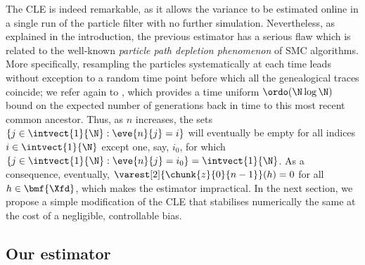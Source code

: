 The CLE is indeed remarkable, as it allows the variance to be estimated online in a single run of the particle filter with no further simulation. Nevertheless, as explained in the introduction, the previous estimator has a serious flaw which is related to the well-known \emph{particle path depletion phenomenon} of SMC algorithms. More specifically, resampling the particles systematically at each time  leads without exception to a random time point before which all the genealogical traces coincide; we refer again to \cite{jacob:murray:rubenthaler:2015}, which provides a time uniform $\ordo(\N \log \N)$ bound on the expected number of generations back in time to this most recent common ancestor. Thus, as $n$ increases, the sets $\{ j \in \intvect{1}{\N} : \eve{n}{j} = i \}$ will eventually be empty for all indices $i \in \intvect{1}{\N}$ except one, say, $i_0$, for which $\{ j \in \intvect{1}{\N} : \eve{n}{j} = i_0 \} = \intvect{1}{\N}$. As a consequence, eventually, $\varest[2]{\chunk{z}{0}{n - 1}}(h) = 0$ for all $h \in \bmf{\Xfd}$, which makes the estimator impractical. In the next section, we propose a simple modification of the CLE that stabilises numerically the same at the cost of a negligible, controllable bias. 

\subsection{Our estimator}
\label{sec:our:estimator}

